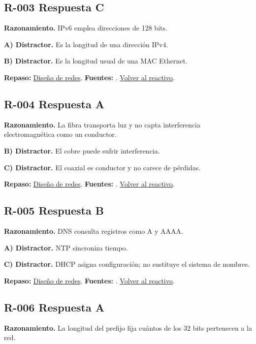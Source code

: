 \subsection*{R-003 \quad Respuesta C}\label{s:R-003}
\textbf{Razonamiento.} IPv6 emplea direcciones de 128 bits.

\textbf{A) Distractor. }Es la longitud de una dirección IPv4.

\textbf{B) Distractor. }Es la longitud usual de una MAC Ethernet.

\textbf{Repaso:} \hyperref[sec:r1]{Diseño de redes}. \textbf{Fuentes:} \cite{rfc8200,rfc4632,networks,vlan}. \hyperref[q:R-003]{Volver al reactivo}.\par\medskip

\subsection*{R-004 \quad Respuesta A}\label{s:R-004}
\textbf{Razonamiento.} La fibra transporta luz y no capta interferencia electromagnética como un conductor.

\textbf{B) Distractor. }El cobre puede sufrir interferencia.

\textbf{C) Distractor. }El coaxial es conductor y no carece de pérdidas.

\textbf{Repaso:} \hyperref[sec:r1]{Diseño de redes}. \textbf{Fuentes:} \cite{rfc8200,rfc4632,networks,vlan}. \hyperref[q:R-004]{Volver al reactivo}.\par\medskip

\subsection*{R-005 \quad Respuesta B}\label{s:R-005}
\textbf{Razonamiento.} DNS consulta registros como A y AAAA.

\textbf{A) Distractor. }NTP sincroniza tiempo.

\textbf{C) Distractor. }DHCP asigna configuración; no sustituye el sistema de nombres.

\textbf{Repaso:} \hyperref[sec:r1]{Diseño de redes}. \textbf{Fuentes:} \cite{rfc8200,rfc4632,networks,vlan}. \hyperref[q:R-005]{Volver al reactivo}.\par\medskip

\subsection*{R-006 \quad Respuesta A}\label{s:R-006}
\textbf{Razonamiento.} La longitud del prefijo fija cuántos de los 32 bits pertenecen a la red.

